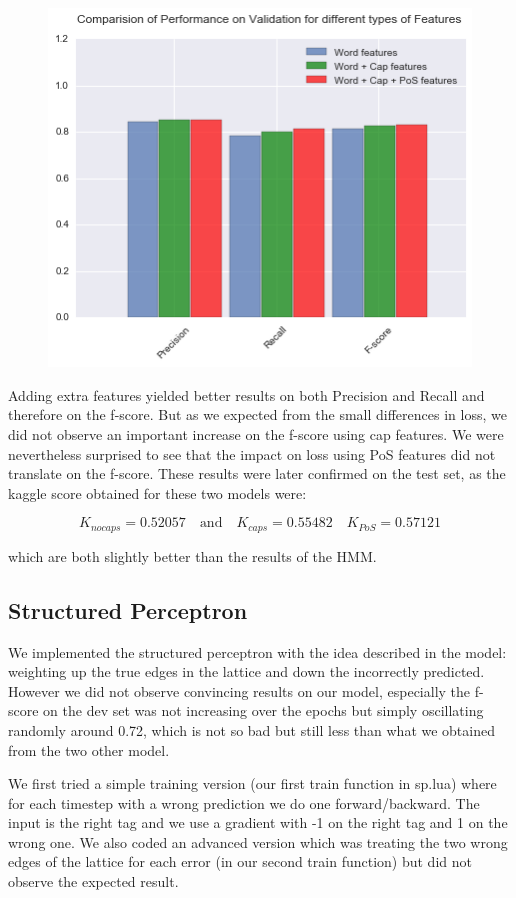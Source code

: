 \documentclass[11pt]{article}
\begin{document}
\begin{figure}[H]
\centering
\includegraphics[width=0.6\linewidth]{prf_cap}
\end{figure}

Adding extra features yielded better results on both Precision and Recall and therefore on the f-score. But as we expected from the small differences in loss, we did not observe an important increase on the f-score using cap features. We were nevertheless surprised to see that the impact on loss using PoS features did not translate on the f-score. These results were later confirmed on the test set, as the kaggle score obtained for these two models were:

$$K_{no caps} = 0.52057 \quad \text{and} \quad K_{caps} = 0.55482 \quad K_{PoS} = 0.57121$$

which are both slightly better than the results of the HMM.

\subsection{Structured Perceptron}

We implemented the structured perceptron with the idea described in the model: weighting up the true edges in the lattice and down the incorrectly predicted. However we did not observe convincing results on our model, especially the f-score on the dev set was not increasing over the epochs but simply oscillating randomly around 0.72, which is not so bad but still less than what we obtained from the two other model.

We first tried a simple training version (our first train function in sp.lua) where for each timestep with a wrong prediction we do one forward/backward. The input is the right tag and we use a gradient with -1 on the right tag and 1 on the wrong one. We also coded an advanced version which was treating the two wrong edges of the lattice for each error (in our second train function) but did not observe the expected result.
\end{document}
